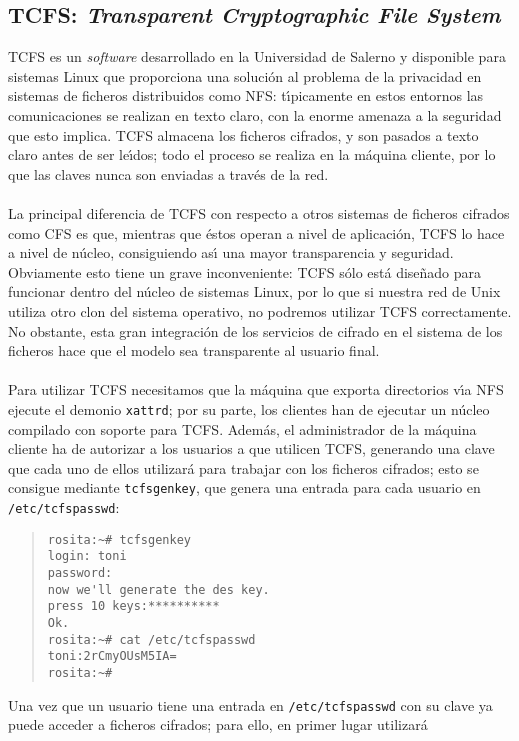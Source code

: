 \subsection{TCFS: {\it Transparent Cryptographic File System}}
TCFS es un {\it software} desarrollado en la Universidad de Salerno y
disponible para sistemas Linux que proporciona una soluci\'on al problema de la
privacidad en sistemas de ficheros distribuidos como NFS: t\'{\i}picamente en 
estos entornos las comunicaciones se realizan en texto claro, con la enorme
amenaza a la seguridad que esto implica. TCFS almacena los ficheros cifrados,
y son pasados a texto claro antes de ser le\'{\i}dos; todo el proceso se
realiza en la m\'aquina cliente, por lo que las claves nunca son enviadas a
trav\'es de la red.\\
\\La principal diferencia de TCFS con respecto a otros sistemas de ficheros
cifrados como CFS es que, mientras que \'estos operan a nivel de aplicaci\'on,
TCFS lo hace a nivel de n\'ucleo, consiguiendo as\'{\i} una mayor transparencia
y seguridad. Obviamente esto tiene un grave inconveniente: TCFS s\'olo est\'a
dise\~nado para funcionar dentro del n\'ucleo de sistemas Linux, por lo que si
nuestra red de Unix utiliza otro clon del sistema operativo, no podremos 
utilizar TCFS correctamente. No obstante, esta gran integraci\'on de los 
servicios de cifrado en el sistema de los ficheros hace que el modelo sea
transparente al usuario final.\\
\\Para utilizar TCFS necesitamos que la m\'aquina que exporta directorios 
v\'{\i}a NFS ejecute el demonio {\tt xattrd}; por su parte, los clientes han de 
ejecutar un n\'ucleo compilado con soporte para TCFS. Adem\'as, el 
administrador de la m\'aquina cliente ha de autorizar a los
usuarios a que utilicen TCFS, generando una clave que cada uno de ellos 
utilizar\'a para trabajar con los ficheros cifrados; esto se consigue mediante
{\tt tcfsgenkey}, que genera una entrada para cada usuario en 
{\tt /etc/tcfspasswd}:
\begin{quote}
\begin{verbatim}
rosita:~# tcfsgenkey
login: toni
password:
now we'll generate the des key.
press 10 keys:**********
Ok.
rosita:~# cat /etc/tcfspasswd
toni:2rCmyOUsM5IA=
rosita:~#
\end{verbatim}
\end{quote}
Una vez que un usuario tiene una entrada en {\tt /etc/tcfspasswd} con su clave
ya puede acceder a ficheros cifrados; para ello, en primer lugar utilizar\'a
